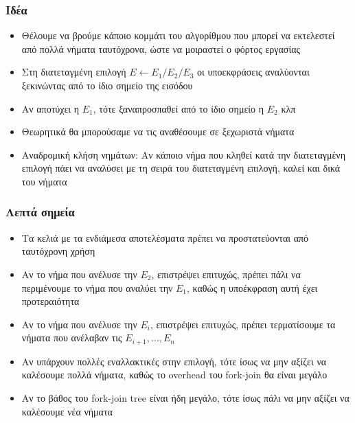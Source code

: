 \documentclass{beamer}
\begin{document}
\begin{frame}
  \frametitle{Ιδέα}
  \begin{itemize}
	\item Θέλουμε να βρούμε κάποιο κομμάτι του αλγορίθμου που μπορεί να εκτελεστεί από πολλά νήματα ταυτόχρονα, ώστε να μοιραστεί ο φόρτος εργασίας \pause
	\item Στη διατεταγμένη επιλογή $E \leftarrow E_1 / E_2 /  E_3$ οι υποεκφράσεις αναλύονται ξεκινώντας από το ίδιο σημείο της εισόδου  \pause
	\item Αν αποτύχει η $E_1$, τότε ξαναπροσπαθεί από το ίδιο σημείο η $E_2$ κλπ\pause
	\item Θεωρητικά θα μπορούσαμε να τις αναθέσουμε σε ξεχωριστά νήματα\pause
	\item Αναδρομική κλήση νημάτων: Αν κάποιο νήμα που κληθεί κατά την διατεταγμένη επιλογή πάει να αναλύσει με τη σειρά του διατεταγμένη επιλογή, καλεί και δικά του νήματα
  \end{itemize}

\end{frame}

\begin{frame}
  \frametitle{Λεπτά σημεία}
  \begin{itemize}
	\item Τα κελιά με τα ενδιάμεσα αποτελέσματα πρέπει να προστατεύονται από ταυτόχρονη χρήση\pause
	\item Αν το νήμα που ανέλυσε την $E_2$, επιστρέψει επιτυχώς, πρέπει πάλι να περιμένουμε το νήμα που αναλύει την $E_1$, καθώς η υποέκφραση αυτή έχει προτεραιότητα \pause
	\item Αν το νήμα που ανέλυσε την $E_i$, επιστρέψει επιτυχώς, πρέπει τερματίσουμε τα νήματα που ανέλαβαν τις $E_{i+1}, \dots, E_n$ \pause
	\item Aν υπάρχουν πολλές εναλλακτικές στην επιλογή, τότε ίσως να μην αξίζει να καλέσουμε πολλά νήματα, καθώς το overhead του fork-join θα είναι μεγάλο \pause
	\item Αν το βάθος του fork-join tree είναι ήδη μεγάλο, τότε ίσως πάλι να μην αξίζει να καλέσουμε νέα νήματα
  \end{itemize}
\end{frame}
\end{document}
